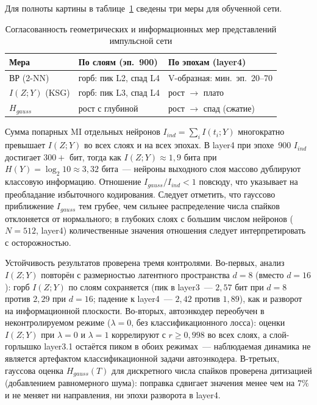 Для полноты картины в таблице~\ref{tab:ib_summary} сведены три меры для обученной сети.

\begin{table}[ht]
\centering
\caption{Согласованность геометрических и информационных мер представлений импульсной сети}
\label{tab:ib_summary}
\begin{tabular}{lll}
\toprule
\textbf{Мера} & \textbf{По слоям (эп.~900)} & \textbf{По эпохам (layer4)} \\
\midrule
ВР (2-NN) & горб: пик L2, спад L4 & V-образная: мин.~эп.~20--70 \\
$I(Z;Y)$ (KSG) & горб: пик L3, спад L4 & рост $\to$ плато \\
$H_{gauss}$ & рост с глубиной & рост $\to$ спад (сжатие) \\
\bottomrule
\end{tabular}
\end{table}

Сумма попарных MI отдельных нейронов $I_{ind} = \sum_i I(t_i; Y)$ многократно превышает $I(Z; Y)$ во всех слоях и на всех эпохах. В layer4 при эпохе~900 $I_{ind}$ достигает $300{+}$ бит, тогда как $I(Z; Y) \approx 1{,}9$ бита при $H(Y) = \log_2 10 \approx 3{,}32$ бита~--- нейроны выходного слоя массово дублируют классовую информацию. Отношение $I_{gauss}/I_{ind} < 1$ повсюду, что указывает на преобладание избыточного кодирования. Следует отметить, что гауссово приближение $I_{gauss}$ тем грубее, чем сильнее распределение числа спайков отклоняется от нормального; в глубоких слоях с большим числом нейронов ($N = 512$, layer4) количественные значения отношения следует интерпретировать с осторожностью.

Устойчивость результатов проверена тремя контролями. Во-первых, анализ $I(Z; Y)$ повторён с размерностью латентного пространства $d = 8$ (вместо $d = 16$): горб $I(Z; Y)$ по слоям сохраняется (пик в layer3~--- $2{,}57$ бит при $d{=}8$ против $2{,}29$ при $d{=}16$; падение к layer4~--- $2{,}42$ против $1{,}89$), как и разворот на информационной плоскости. Во-вторых, автоэнкодер переобучен в неконтролируемом режиме ($\lambda = 0$, без классификационного лосса): оценки $I(Z; Y)$ при $\lambda = 0$ и $\lambda = 1$ коррелируют с $r \geq 0{,}998$ во всех слоях, а слой-горлышко layer3.1 остаётся пиком в обоих режимах~--- наблюдаемая динамика не является артефактом классификационной задачи автоэнкодера. В-третьих, гауссова оценка $H_{gauss}(T)$ для дискретного числа спайков проверена дитизацией (добавлением равномерного шума): поправка сдвигает значения менее чем на $7\%$ и не меняет ни направления, ни эпохи разворота в layer4.

